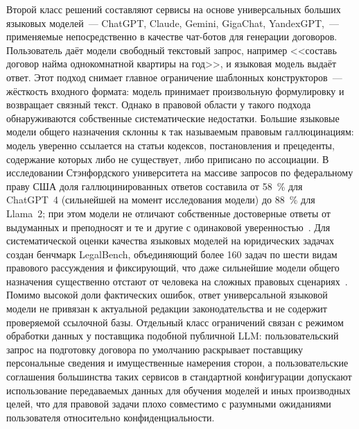 Второй класс решений составляют сервисы на основе универсальных больших языковых моделей~--- ChatGPT, Claude, Gemini, GigaChat, YandexGPT,~--- применяемые непосредственно в качестве чат-ботов для генерации договоров. Пользователь даёт модели свободный текстовый запрос, например <<составь договор найма однокомнатной квартиры на год>>, и языковая модель выдаёт ответ. Этот подход снимает главное ограничение шаблонных конструкторов~--- жёсткость входного формата: модель принимает произвольную формулировку и возвращает связный текст. Однако в правовой области у такого подхода обнаруживаются собственные систематические недостатки. Большие языковые модели общего назначения склонны к так называемым правовым галлюцинациям: модель уверенно ссылается на статьи кодексов, постановления и прецеденты, содержание которых либо не существует, либо приписано по ассоциации. В исследовании Стэнфордского университета на массиве запросов по федеральному праву США доля галлюцинированных ответов составила от 58~\% для ChatGPT~4 (сильнейшей на момент исследования модели) до 88~\% для Llama~2; при этом модели не отличают собственные достоверные ответы от выдуманных и преподносят и те и другие с одинаковой уверенностью~\cite{dahl2024legalfictions}. Для систематической оценки качества языковых моделей на юридических задачах создан бенчмарк {LegalBench}, объединяющий более 160 задач по шести видам правового рассуждения и фиксирующий, что даже сильнейшие модели общего назначения существенно отстают от человека на сложных правовых сценариях~\cite{guha2023legalbench}. Помимо высокой доли фактических ошибок, ответ универсальной языковой модели не привязан к актуальной редакции законодательства и не содержит проверяемой ссылочной базы. Отдельный класс ограничений связан с режимом обработки данных у поставщика подобной публичной LLM: пользовательский запрос на подготовку договора по умолчанию раскрывает поставщику персональные сведения и имущественные намерения сторон, а пользовательские соглашения большинства таких сервисов в стандартной конфигурации допускают использование передаваемых данных для обучения моделей и иных производных целей, что для правовой задачи плохо совместимо с разумными ожиданиями пользователя относительно конфиденциальности.

